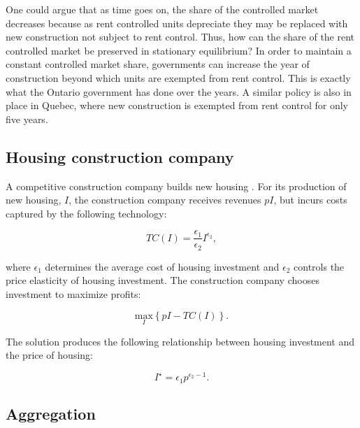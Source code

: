 \documentclass[parskip=full]{article}
\begin{document}
One could argue that as time goes on, the share of the controlled market decreases because as rent controlled units depreciate they may be replaced with new construction not subject to rent control. Thus, how can the share of the rent controlled market be preserved in stationary equilibrium? In order to maintain a constant controlled market share, governments can increase the year of construction beyond which units are exempted from rent control. This is exactly what the Ontario government has done over the years. A similar policy is also in place in Quebec, where new construction is exempted from rent control for only five years.

\subsection{Housing construction company}\label{sec:construction_company}

A competitive construction company builds new housing \citep{rotberg-2022}. For its production of new housing, $I$, the construction company receives revenues $pI$, but incurs costs captured by the following technology:

\begin{equation*}
TC(I)=\frac{\epsilon_{1}}{\epsilon_{2}}I^{\epsilon_{2}}\label{eq:total_cost_structure},
\end{equation*}

\noindent where $\epsilon_{1}$ determines the average cost of housing investment and $\epsilon_{2}$ controls the price elasticity of housing investment. The construction company chooses investment to maximize profits:

\begin{equation*}
\label{eq:construction_company_profits}
\underset{I} {\text{$\mbox{max}$}}{\left\{p I-TC(I)\right\}}.
\end{equation*}

\noindent The solution produces the following relationship between housing investment and the price of housing:

\begin{equation}
\label{eq:construction_company_first_order_condition}
I^{\star}=\epsilon_{1} p^{\epsilon_{2}-1}.
\end{equation}

\subsection{Aggregation}\label{subsection:aggregation}
\end{document}
